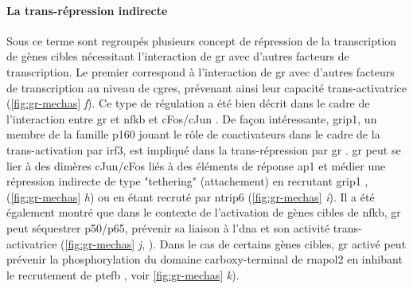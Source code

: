 \documentclass[../main.tex]{subfiles}
\begin{document}
\paragraph{La trans-répression indirecte}
Sous ce terme sont regroupés plusieurs concept de répression de la transcription de gènes cibles nécessitant l'interaction de \gls{gr} avec d'autres facteurs de transcription.
Le premier correspond à l'interaction de \gls{gr} avec d'autres facteurs de transcription au niveau de \glspl{cgre}, prévenant ainsi leur capacité trans-activatrice (\autoref{fig:gr-mechas} \textit{f}).
Ce type de régulation a été bien décrit dans le cadre de l'interaction entre \gls{gr} et \gls{nfkb} \citep{Ray1994} et cFos/cJun \citep{Pearce1993}.
De façon intéressante, \gls{grip1}, un membre de la famille p160 jouant le rôle de coactivateurs dans le cadre de la trans-activation par \gls{irf3}, est impliqué dans la trans-répression par \gls{gr} \citep{Reily2006}.
\gls{gr} peut se lier à des dimères cJun/cFos liés à des éléments de réponse \gls{ap1} et médier une répression indirecte de type "tethering" (attachement) en recrutant \gls{grip1} \citep{Rogatsky2002}, (\autoref{fig:gr-mechas} \textit{h}) ou en étant recruté par \gls{ntrip6} (\autoref{fig:gr-mechas} \textit{i}).
Il a été également montré que dans le contexte de l'activation de gènes cibles de \gls{nfkb}, \gls{gr} peut séquestrer p50/p65, prévenir sa liaison à l'\gls{dna} et son activité trans-activatrice (\autoref{fig:gr-mechas} \textit{j}, \citet{Mukaida1994,DeBosscher2003}).
Dans le cas de certains gènes cibles, \gls{gr} activé peut prévenir la phosphorylation du domaine carboxy-terminal de \gls{rnapol2} \citep{Nissen2000} en inhibant le recrutement de \gls{ptefb} \citep{Luecke2005}, voir \autoref{fig:gr-mechas} \textit{k}).
\end{document}
